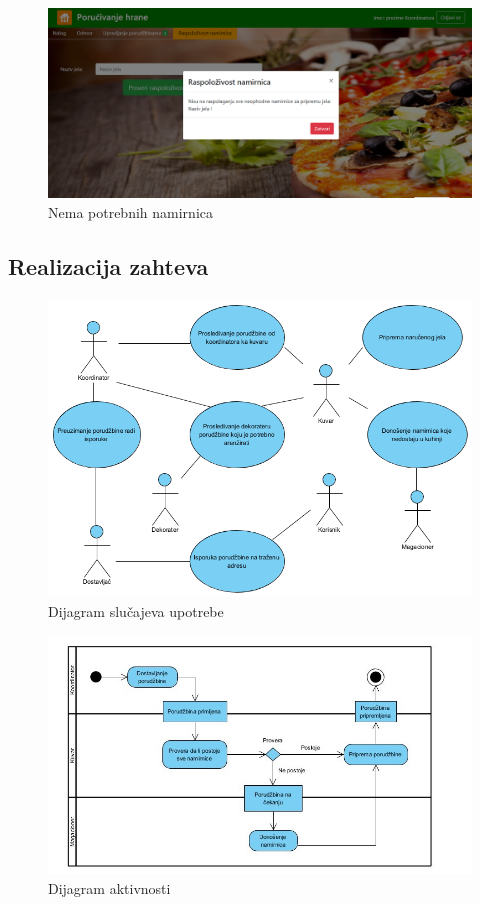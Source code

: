 \begin{figure}[!h]
    \includegraphics[width=1\textwidth]{slike/nedovoljno_namirnica.png}
    \caption{Nema potrebnih namirnica} %
    \label{fig:slika_kontakt}
\end{figure}

\newpage

\subsection{Realizacija zahteva}
\begin{figure}[!h]
    \includegraphics[width=1\textwidth]{slike/Realizacija_zahteva.png}
    \caption{Dijagram slu\v cajeva upotrebe} %
    \label{fig:slika4}
\end{figure}
 \begin{figure}[!h]
    \includegraphics[width=1\textwidth]{slike/Realizacija_zahteva_dijagram_aktivnosti.jpg}
    \caption{Dijagram aktivnosti} %
    \label{fig:slika6}
\end{figure}
\newpage
